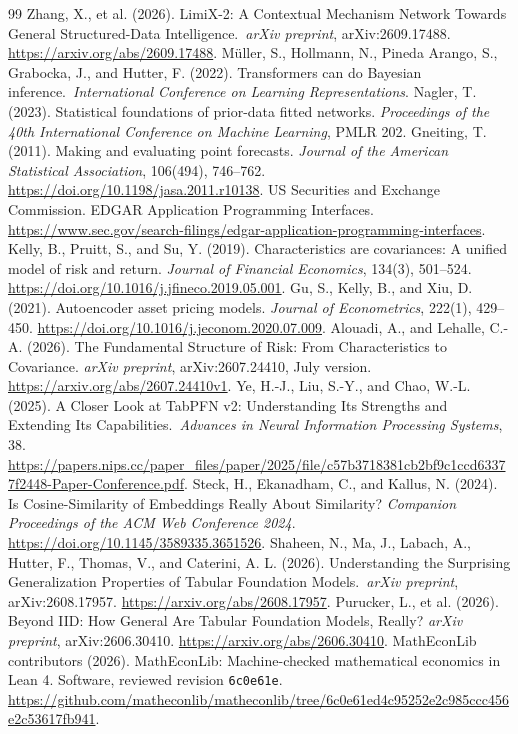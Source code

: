 \documentclass[11pt]{article}
\begin{document}
\begin{thebibliography}{99}
  Zhang, X., et al. (2026). LimiX-2: A Contextual Mechanism Network
  Towards General
  Structured-Data Intelligence.\ \emph{arXiv preprint}, arXiv:2609.17488.
  \url{https://arxiv.org/abs/2609.17488}.
  M\"uller, S., Hollmann, N., Pineda Arango, S., Grabocka, J., and Hutter, F.
  (2022). Transformers can do Bayesian inference.\ \emph{International
  Conference on Learning Representations}.
  Nagler, T. (2023). Statistical foundations of prior-data fitted networks.
  \emph{Proceedings of the 40th International Conference on Machine Learning},
  PMLR 202.
  Gneiting, T. (2011). Making and evaluating point forecasts.
  \emph{Journal of the American Statistical Association}, 106(494), 746--762.
  \url{https://doi.org/10.1198/jasa.2011.r10138}.
  US Securities and Exchange Commission.
  EDGAR Application Programming Interfaces.
  \url{https://www.sec.gov/search-filings/edgar-application-programming-interfaces}.
  Kelly, B., Pruitt, S., and Su, Y. (2019).
  Characteristics are covariances: A unified model of risk and return.
  \emph{Journal of Financial Economics}, 134(3), 501--524.
  \url{https://doi.org/10.1016/j.jfineco.2019.05.001}.
  Gu, S., Kelly, B., and Xiu, D. (2021).
  Autoencoder asset pricing models.
  \emph{Journal of Econometrics}, 222(1), 429--450.
  \url{https://doi.org/10.1016/j.jeconom.2020.07.009}.
  Alouadi, A., and Lehalle, C.-A. (2026).
  The Fundamental Structure of Risk: From Characteristics to Covariance.
  \emph{arXiv preprint}, arXiv:2607.24410, July version.
  \url{https://arxiv.org/abs/2607.24410v1}.
  Ye, H.-J., Liu, S.-Y., and Chao, W.-L. (2025).
  A Closer Look at TabPFN v2: Understanding Its Strengths and Extending Its
  Capabilities.\ \emph{Advances in Neural Information Processing Systems}, 38.
  \url{https://papers.nips.cc/paper_files/paper/2025/file/c57b3718381cb2bf9c1ccd63377f2448-Paper-Conference.pdf}.
  Steck, H., Ekanadham, C., and Kallus, N. (2024).
  Is Cosine-Similarity of Embeddings Really About Similarity?
  \emph{Companion Proceedings of the ACM Web Conference 2024}.
  \url{https://doi.org/10.1145/3589335.3651526}.
  Shaheen, N., Ma, J., Labach, A., Hutter, F., Thomas, V., and Caterini, A. L.
  (2026). Understanding the Surprising Generalization Properties of Tabular
  Foundation Models.\ \emph{arXiv preprint}, arXiv:2608.17957.
  \url{https://arxiv.org/abs/2608.17957}.
  Purucker, L., et al. (2026).
  Beyond IID\@:  How General Are Tabular Foundation Models, Really?
  \emph{arXiv preprint}, arXiv:2606.30410.
  \url{https://arxiv.org/abs/2606.30410}.
  MathEconLib contributors (2026).
  MathEconLib: Machine-checked mathematical economics in Lean 4.
  Software, reviewed revision \texttt{6c0e61e}.
  \url{https://github.com/matheconlib/matheconlib/tree/6c0e61ed4c95252e2c985ccc456e2c53617fb941}.
\end{thebibliography}
\end{document}
